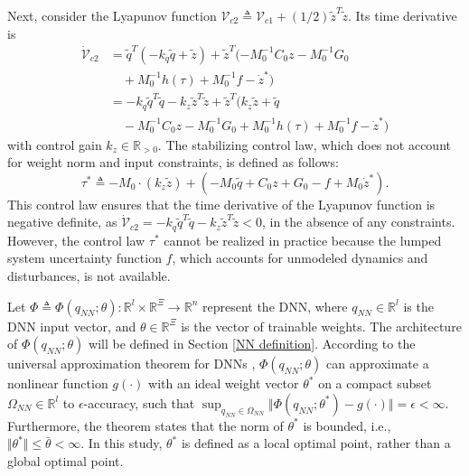 \documentclass[lettersize,journal]{IEEEtran}
\begin{document}
Next, consider the Lyapunov function ${\mathcal V}_{c2}\triangleq {\mathcal V}_{c1} + (1/2) {\tilde z}^T  {\tilde z}$.
Its time derivative is
\begin{equation}
    \begin{aligned}
    \dot {\mathcal V}_{c2} &=
    {\tilde q}^T  (-{k_q}{\tilde q}+{\tilde z}) +{\tilde z}^T  (-M_0^{-1} C _0{z} -M_0^{-1} G_0\\
    &\quad
    +M_0^{-1}h(\tau)+M_0^{-1} f- \dot z^*)\\
    &= -{k_q}{\tilde q}^T  {\tilde q} -{k_z}{\tilde z}^T  {\tilde z} +{\tilde z}^T  ({k_z}{\tilde z}+{\tilde q}\\
    &\quad-M_0^{-1} C_0{z} -M_0^{-1} G_0+M_0^{-1} h(\tau)+M_0^{-1} f- \dot z^* )
    \end{aligned}
\end{equation}
with control gain ${k_z}\in\mathbb{R}_{>0}$. 
The stabilizing control law, which does not account for weight norm and input constraints, is defined as follows:
\begin{equation}
    \tau^* \triangleq-M_0\cdot ({k_z}{\tilde z})+ 
    ( 
        -M_0{\tilde q}+C_0{z}+G_0-f+M_0 \dot z^*
    ).
    \label{eq. desired control}
\end{equation}
This control law ensures that the time derivative of the Lyapunov function is negative definite, as $\dot {\mathcal V}_{c2} = -{k_q}{\tilde q}^T  {\tilde q}-{k_z}{\tilde z}^T  {\tilde z}<0$, in the absence of any constraints. However, the control law $\tau^*$ cannot be realized in practice because the lumped system uncertainty function $f$, which accounts for unmodeled dynamics and disturbances, is not available.

Let $\Phi\triangleq\Phi(q_{NN};\theta): \mathbb{R}^{l}\times\mathbb{R}^{\Xi}\to\mathbb{R}^{n}$ represent the DNN, where $q_{NN}\in\mathbb{R}^{l}$ is the DNN input vector, and $\theta\in\mathbb{R}^{\Xi}$ is the vector of trainable weights.
The architecture of $\Phi(q_{NN};\theta)$ will be defined in Section \ref{NN definition}.
According to the universal approximation theorem for DNNs \cite{RN33}, $\Phi(q_{NN};\theta)$ can approximate a nonlinear function $g(\cdot)$ with an ideal weight vector $\theta^*$ on a compact subset $\Omega_{NN}\in\mathbb{R}^{l}$ to $\epsilon$-accuracy, such that $\sup_{q_{NN}\in\Omega_{NN}}\Vert \Phi(q_{NN};\theta^*) - g(\cdot) \Vert = \epsilon < \infty$.
Furthermore, the theorem states that the norm of $\theta^*$ is bounded, i.e., $\Vert\theta^*\Vert\le \bar\theta<\infty$.
In this study, $\theta^*$ is defined as a local optimal point, rather than a global optimal point.
\end{document}
